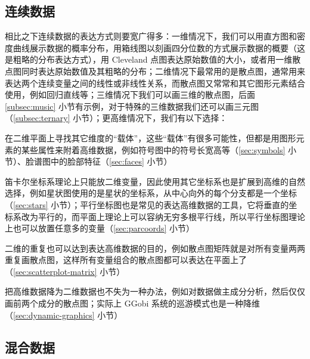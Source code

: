 \documentclass[
  b5paper,
  UTF8,twoside]{book}
\providecommand{\tightlist}{%
  \setlength{\itemsep}{0pt}\setlength{\parskip}{0pt}}
\begin{document}
\subsection{连续数据}\label{ux8fdeux7eedux6570ux636e}

相比之下连续数据的表达方式则要宽广得多：一维情况下，我们可以用直方图和密度曲线展示数据的概率分布，用箱线图以刻画四分位数的方式展示数据的概要（这是粗略的分布表达方式），用 Cleveland 点图表达原始数值的大小，或者用一维散点图同时表达原始数值及其粗略的分布；二维情况下最常用的是散点图，通常用来表达两个连续变量之间的线性或非线性关系，而散点图又常常和其它图形元素结合使用，例如回归直线等；三维情况下我们可以画三维的散点图，后面 \ref{subsec:music} 小节有示例，对于特殊的三维数据我们还可以画三元图（\ref{subsec:ternary} 小节）；更高维情况下，我们有以下选择：

\begin{description}
\tightlist
\item[寻找载体]
在二维平面上寻找其它维度的``载体''，这些``载体''有很多可能性，但都是用图形元素的某些属性来附着高维数据，例如符号图中的符号长宽高等（\ref{sec:symbols} 小节）、脸谱图中的脸部特征（\ref{sec:faces} 小节）
\item[更改坐标系]
笛卡尔坐标系理论上只能放二维变量，因此使用其它坐标系也是扩展到高维的自然选择，例如星状图使用的是星状的坐标系，从中心向外的每个分支都是一个坐标（\ref{sec:stars} 小节）；平行坐标图也是常见的表达高维数据的工具，它将垂直的坐标系改为平行的，而平面上理论上可以容纳无穷多根平行线，所以平行坐标图理论上也可以放置任意多的变量（\ref{sec:parcoords} 小节）
\item[重复二维图形]
二维的重复也可以达到表达高维数据的目的，例如散点图矩阵就是对所有变量两两重复画散点图，这样所有变量组合的散点图都可以表达在平面上了（\ref{sec:scatterplot-matrix} 小节）
\item[降维]
把高维数据降为二维数据也不失为一种办法，例如对数据做主成分分析，然后仅仅画前两个成分的散点图；实际上 GGobi 系统的巡游模式也是一种降维（\ref{sec:dynamic-graphics} 小节）
\end{description}

\subsection{混合数据}\label{ux6df7ux5408ux6570ux636e}
\end{document}
